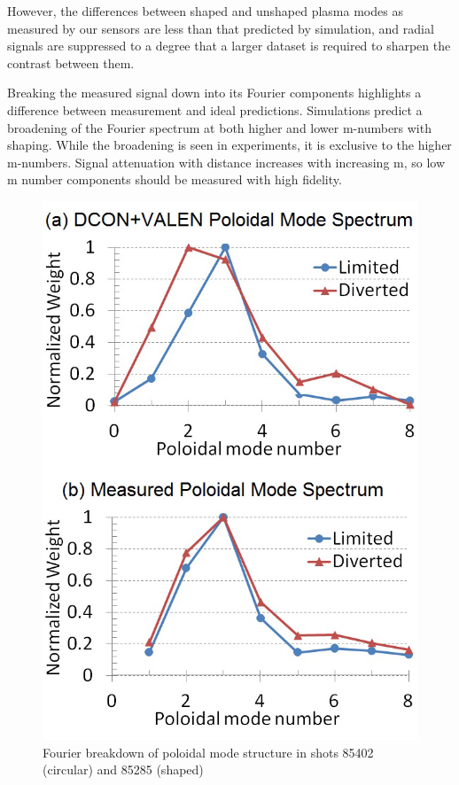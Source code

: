 \documentclass[aps,prl,twocolumn,superscriptaddress,groupedaddress]{revtex4}  %
\begin{document}
However, the differences between shaped and unshaped plasma modes as measured by our sensors are less than that predicted by simulation, and radial signals are suppressed to a degree that a larger dataset is required to sharpen the contrast between them.\par
	Breaking the measured signal down into its Fourier components highlights a difference between measurement and ideal predictions.  Simulations predict a broadening of the Fourier spectrum at both higher and lower m-numbers with shaping.  While the broadening is seen in experiments, it is exclusive to the higher m-numbers.  Signal attenuation with distance increases with increasing m, so low m number components should be measured with high fidelity.\par
	\begin{figure}[htb]
	\centering
\includegraphics[scale=.5]{../Plots/fig2_mode_spectrum_REV2.png}\caption{Fourier breakdown of poloidal mode structure in shots 85402 (circular) and 85285 (shaped)}
	\label{mike_mode_structure}
	\end{figure}
\end{document}
